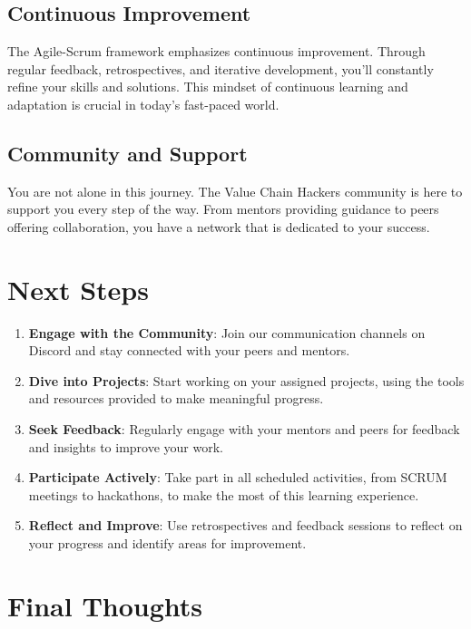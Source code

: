 \documentclass[
  letterpaper,
  DIV=11,
  numbers=noendperiod]{scrreprt}
\providecommand{\tightlist}{%
  \setlength{\itemsep}{0pt}\setlength{\parskip}{0pt}}\usepackage{longtable,booktabs,array}
\begin{document}
\subsection{Continuous Improvement 🔄}\label{continuous-improvement-3}

The Agile-Scrum framework emphasizes continuous improvement. Through
regular feedback, retrospectives, and iterative development, you'll
constantly refine your skills and solutions. This mindset of continuous
learning and adaptation is crucial in today's fast-paced world.

\subsection{Community and Support 🧑‍🤝‍🧑}\label{community-and-support}

You are not alone in this journey. The Value Chain Hackers community is
here to support you every step of the way. From mentors providing
guidance to peers offering collaboration, you have a network that is
dedicated to your success.

\section{Next Steps}\label{next-steps}

\begin{enumerate}
\def\labelenumi{\arabic{enumi}.}
\tightlist
\item
  \textbf{Engage with the Community}: Join our communication channels on
  Discord and stay connected with your peers and mentors.
\item
  \textbf{Dive into Projects}: Start working on your assigned projects,
  using the tools and resources provided to make meaningful progress.
\item
  \textbf{Seek Feedback}: Regularly engage with your mentors and peers
  for feedback and insights to improve your work.
\item
  \textbf{Participate Actively}: Take part in all scheduled activities,
  from SCRUM meetings to hackathons, to make the most of this learning
  experience.
\item
  \textbf{Reflect and Improve}: Use retrospectives and feedback sessions
  to reflect on your progress and identify areas for improvement.
\end{enumerate}

\section{Final Thoughts}\label{final-thoughts}
\end{document}
